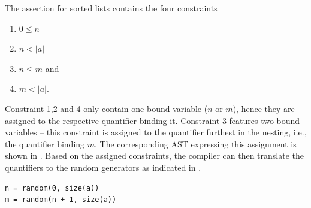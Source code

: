 The assertion for sorted lists contains the four constraints
\begin{enumerate}
\itemsep-1em
\item $0 \leq n$
\item $n < |a| $
\item $n \le m$ and
\item $m < |a|$.
\end{enumerate}
Constraint 1,2 and 4 only contain one bound variable ($n$ or $m$), hence they are assigned to the respective quantifier binding it. Constraint 3 features two bound variables -- this constraint is assigned to the quantifier furthest in the nesting, i.e., the quantifier binding $m$. The corresponding AST expressing this assignment is shown in . Based on the assigned constraints, the compiler can then translate the quantifiers to the random generators as indicated in .
\begin{lstlisting}[label=lst:rand, caption=Random generators for the sorted list assertion, numbers=none]
n = random(0, size(a))
m = random(n + 1, size(a))
\end{lstlisting}

